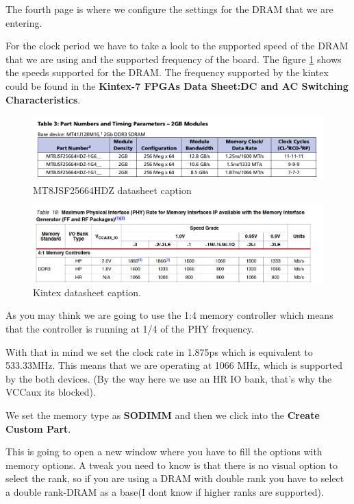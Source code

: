 The fourth page is where we configure the settings for the DRAM that we are entering.

For the clock period we have to take a look to the supported speed of the DRAM that we are using and the supported frequency of the board.
The figure \ref{fig:dram_data_spedd} shows the speeds supported for the DRAM. The frequency supported by the kintex could be found in the \textbf{Kintex-7 FPGAs Data Sheet:DC and AC Switching Characteristics}.
\begin{figure}
    \centering
    \includegraphics[scale=0.35]{img/dram_speed.png}
    \caption{ MT8JSF25664HDZ datasheet caption}
    \label{fig:dram_data_spedd}
\end{figure}

\begin{figure}
    \centering
    \includegraphics[scale=0.4]{img/kintex_speed.png}
    \caption{Kintex datasheet caption.}
    \label{fig:kintex_data}
\end{figure}

As you may think we are going to use the 1:4 memory controller which means that the controller is running at 1/4 of the PHY frequency.

With that in mind we set the clock rate in 1.875ps which is equivalent to 533.33MHz. This means that we are operating at 1066 MHz, which is supported by the both devices. (By the way here we use an HR IO bank, that's why the VCCaux its blocked).


We set the memory type as \textbf{SODIMM} and then we click into the \textbf{Create Custom Part}.

This is going to open a new window where you have to fill the options with memory options. A tweak you need to know is that there is no visual option to select the rank, so if you are using a DRAM with double rank you have to select a double rank-DRAM as a base(I dont know if higher ranks are supported).

